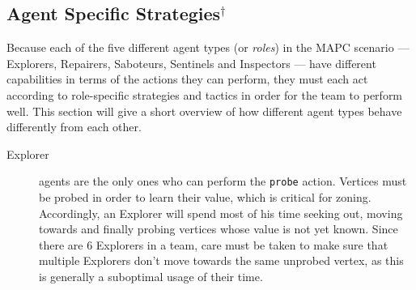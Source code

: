 \subsection{Agent Specific Strategies$^\dagger$}\label{alg:agentstrategies}
Because each of the five different agent types (or \emph{roles}) in the MAPC scenario --- Explorers, Repairers, Saboteurs, Sentinels and Inspectors --- have different capabilities in terms of the actions they can perform, they must each act according to role-specific strategies and tactics in order for the team to perform well.
This section will give a short overview of how different agent types behave differently from each other.
\begin{description}
    \item[Explorer] agents are the only ones who can perform the \texttt{probe} action.
        Vertices must be probed in order to learn their value, which is critical for zoning.
        Accordingly, an Explorer will spend most of his time seeking out, moving towards and finally probing vertices whose value is not yet known.
        Since there are 6 Explorers in a team, care must be taken to make sure that multiple Explorers don't move towards the same unprobed vertex, as this is generally a suboptimal usage of their time.


\end{description}
